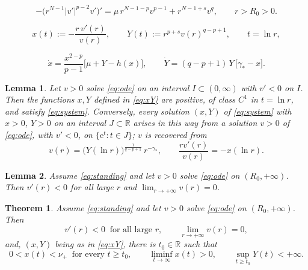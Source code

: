 \documentclass[10pt,a4paper]{amsart}
\newtheorem{theorem}{Theorem}
\newtheorem{lemma}{Lemma}
\newcommand{\R}{\mathbb{R}}
\newcommand{\gs}{\gamma_{*}}
\begin{document}
\begin{equation}\label{eq:ode}
-\big(r^{N-1}|v'|^{p-2}v'\big)'
=\mu\,r^{N-1-p}v^{p-1}+r^{N-1+s}v^{q},
\qquad r>R_{0}>0 .
\end{equation}

\begin{equation}\label{eq:xY}
x(t):=-\frac{r\,v'(r)}{v(r)},\qquad
Y(t):=r^{p+s}v(r)^{q-p+1},\qquad t=\ln r ,
\end{equation}

\begin{equation}\label{eq:system}
\dot x=\frac{x^{2-p}}{p-1}\big[\mu+Y-h(x)\big],
\qquad
\dot Y=(q-p+1)\,Y\,\big[\gs-x\big] .
\end{equation}

\begin{lemma}\label{lem:system}
Let $v>0$ solve \eqref{eq:ode} on an interval $I\subset(0,\infty)$ with
$v'<0$ on $I$. Then the functions $x,Y$ defined in \eqref{eq:xY} are positive,
of class $C^{1}$ in $t=\ln r$, and satisfy \eqref{eq:system}. Conversely, every
solution $(x,Y)$ of \eqref{eq:system} with $x>0$, $Y>0$ on an interval
$J\subset\R$ arises in this way from a solution $v>0$ of \eqref{eq:ode}, with
$v'<0$, on $\{\mathrm e^{t}:t\in J\}$; $v$ is recovered from
\begin{equation}\label{eq:recover}
v(r)=\big(Y(\ln r)\big)^{\frac{1}{q-p+1}}\,r^{-\gs},
\qquad
\frac{r v'(r)}{v(r)}=-x(\ln r) .
\end{equation}
\end{lemma}

\begin{lemma}\label{lem:auto}
Assume \eqref{eq:standing} and let $v>0$ solve \eqref{eq:ode} on
$(R_{0},+\infty)$. Then $v'(r)<0$ for all large $r$ and
$\lim_{r\to+\infty}v(r)=0$.
\end{lemma}

\begin{theorem}\label{thm:apriori}
Assume \eqref{eq:standing} and let $v>0$ solve \eqref{eq:ode} on
$(R_{0},+\infty)$. Then
\begin{equation}\label{eq:auto}
v'(r)<0\ \text{ for all large }r,
\qquad
\lim_{r\to+\infty}v(r)=0 ,
\end{equation}
and, $(x,Y)$ being as in \eqref{eq:xY}, there is $t_{0}\in\R$ such that
\begin{equation}\label{eq:apriori}
0<x(t)<\nu_{+}\ \text{ for every }t\ge t_{0},
\qquad \liminf_{t\to\infty}x(t)>0,
\qquad \sup_{t\ge t_{0}}Y(t)<+\infty .
\end{equation}
\end{theorem}
\end{document}
